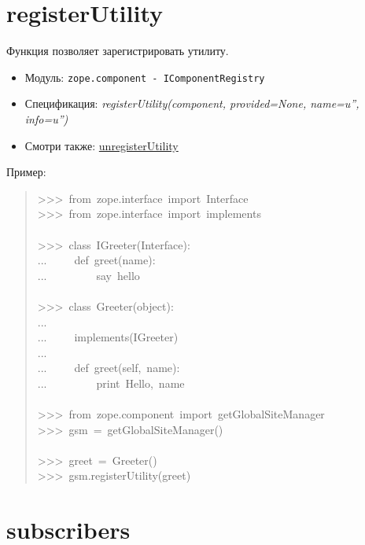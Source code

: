 \documentclass[14pt,a4paper,openany,twoside,final]{extbook}
\providecommand*{\DUroletitlereference}[1]{\textsl{#1}}
\begin{document}
\section*{registerUtility%
  \label{registerutility}%
}

Функция позволяет зарегистрировать утилиту.

\begin{itemize}

\item Модуль: \texttt{zope.component - IComponentRegistry}

\item Спецификация: \DUroletitlereference{registerUtility(component, provided=None, name=u'',
info=u'')}

\item Смотри также: \hyperref[unregisterutility]{unregisterUtility}

\end{itemize}

Пример:

\begin{quote}{\ttfamily \raggedright \noindent
>{}>{}>~from~zope.interface~import~Interface\\
>{}>{}>~from~zope.interface~import~implements\\
~\\
>{}>{}>~class~IGreeter(Interface):\\
...~~~~~def~greet(name):\\
...~~~~~~~~~\textquotedbl{}say~hello\textquotedbl{}\\
~\\
>{}>{}>~class~Greeter(object):\\
...\\
...~~~~~implements(IGreeter)\\
...\\
...~~~~~def~greet(self,~name):\\
...~~~~~~~~~print~\textquotedbl{}Hello\textquotedbl{},~name\\
~\\
>{}>{}>~from~zope.component~import~getGlobalSiteManager\\
>{}>{}>~gsm~=~getGlobalSiteManager()\\
~\\
>{}>{}>~greet~=~Greeter()\\
>{}>{}>~gsm.registerUtility(greet)
}
\end{quote}


\section*{subscribers%
  \label{subscribers}%
}
\end{document}
